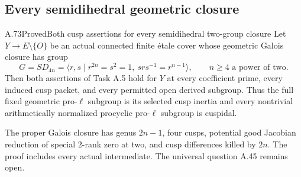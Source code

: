 \subsection{Every semidihedral geometric closure}

\begin{statement}{A.73}{Proved}{Both cusp assertions for every semidihedral two-group closure}
Let \(Y\to E\setminus\{O\}\) be an actual connected finite
\'{e}tale cover whose geometric Galois closure has group
\[
 G=SD_{4n}=\langle r,s\mid r^{2n}=s^2=1,
                              \ srs^{-1}=r^{n-1}\rangle,
 \qquad n\ge4\text{ a power of two}.                 \tag{A.73.1}
\]
Then both assertions of Task A.5 hold for \(Y\) at every
coefficient prime, every induced cusp packet, and every
permitted open derived subgroup. Thus the full fixed geometric
pro-\(\ell\) subgroup is its selected cusp inertia and every
nontrivial arithmetically normalized procyclic pro-\(\ell\)
subgroup is cuspidal.

The proper Galois closure has genus \(2n-1\), four cusps,
potential good Jacobian reduction of special \(2\)-rank zero
at two, and cusp differences killed by \(2n\). The proof
includes every actual intermediate. The universal question
A.45 remains open.
\end{statement}

